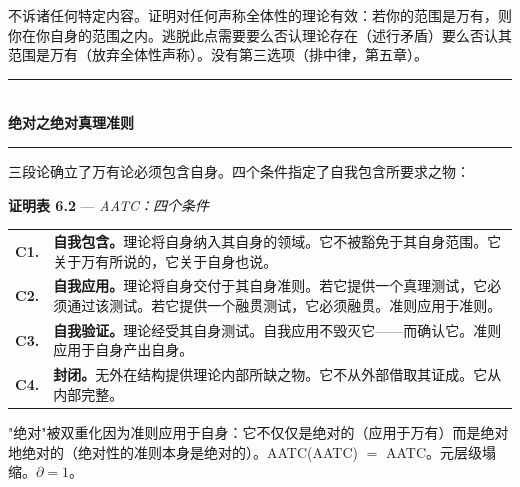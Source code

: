 \documentclass[10pt, openany, oneside]{book}
\renewcommand{\normalsize}{\fontsize{10}{13}\selectfont}
\renewcommand{\footnotesize}{\fontsize{8.5}{11}\selectfont}
\begin{document}
\vspace{0.8em}

\noindent 不诉诸任何特定内容。证明对任何声称全体性的理论有效：若你的范围是万有，则你在你自身的范围之内。逃脱此点需要要么否认理论存在（述行矛盾）要么否认其范围是万有（放弃全体性声称）。没有第三选项（排中律，第五章）。

\vspace{1.5em}


\begin{center}
    \rule{0.3\textwidth}{0.4pt}\\[0.5em]
    {\normalsize\bfseries\scshape 绝对之绝对真理准则}\\[0.3em]
    \rule{0.3\textwidth}{0.4pt}
\end{center}

\vspace{1em}

\noindent 三段论确立了万有论必须包含自身。四个条件指定了自我包含所要求之物：

\vspace{0.5em}

\textbf{证明表 6.2} --- \textit{AATC：四个条件}

\vspace{0.5em}

{\footnotesize
\noindent\begin{tabular}{r p{}}
\textbf{C1.} & \textbf{自我包含。}理论将自身纳入其自身的领域。它不被豁免于其自身范围。它关于万有所说的，它关于自身也说。\\[0.3em]
\textbf{C2.} & \textbf{自我应用。}理论将自身交付于其自身准则。若它提供一个真理测试，它必须通过该测试。若它提供一个融贯测试，它必须融贯。准则应用于准则。\\[0.3em]
\textbf{C3.} & \textbf{自我验证。}理论经受其自身测试。自我应用不毁灭它——而确认它。准则应用于自身产出自身。\\[0.3em]
\textbf{C4.} & \textbf{封闭。}无外在结构提供理论内部所缺之物。它不从外部借取其证成。它从内部完整。\\[0.3em]
\end{tabular}
}

\vspace{0.8em}

\noindent "绝对"被双重化因为准则应用于自身：它不仅仅是绝对的（应用于万有）而是绝对地绝对的（绝对性的准则本身是绝对的）。AATC(AATC) $=$ AATC。元层级塌缩。$\partial = 1$。
\end{document}
